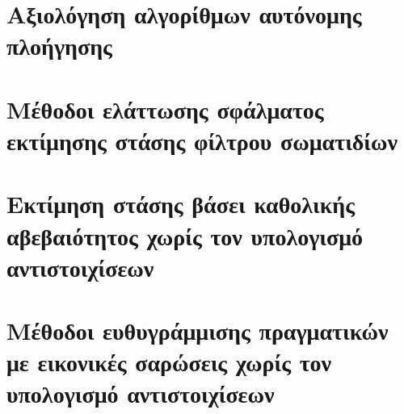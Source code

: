 \chapter{Αξιολόγηση αλγορίθμων αυτόνομης πλοήγησης}
  \label{part:02:chapter:01}
  

\chapter{Μέθοδοι ελάττωσης σφάλματος εκτίμησης στάσης φίλτρου σωματιδίων}
  \label{part:02:chapter:02}
  

\chapter{Εκτίμηση στάσης βάσει καθολικής αβεβαιότητος χωρίς τον υπολογισμό αντιστοιχίσεων}
  \label{part:02:chapter:03}
  

\chapter{Μέθοδοι ευθυγράμμισης πραγματικών με εικονικές σαρώσεις χωρίς τον υπολογισμό αντιστοιχίσεων}
  \label{part:02:chapter:04}
  

